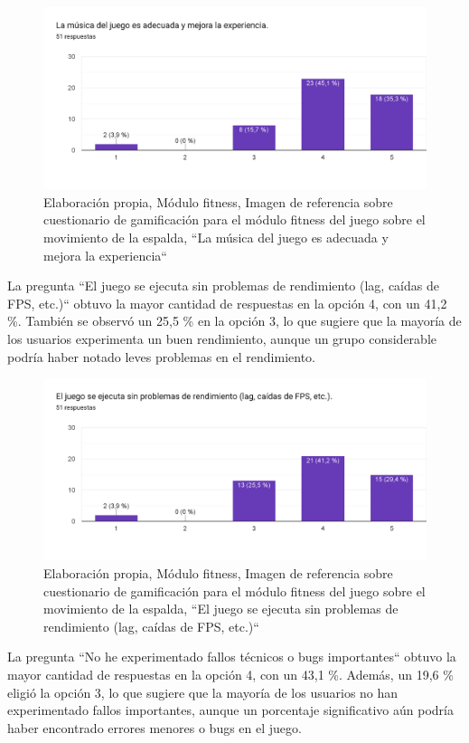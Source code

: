 \begin{figure}[H]
  \centering
  \includegraphics[width=0.7\linewidth]{Imagenes/fd7.png}
  \caption{Elaboración propia, Módulo fitness, Imagen de referencia sobre cuestionario de gamificación para el módulo fitness del juego sobre el movimiento de la espalda, ``La música del juego es adecuada y mejora la experiencia``}
  \label{fig:cuestionario18fitness}
\end{figure}


La pregunta ``El juego se ejecuta sin problemas de rendimiento (lag, caídas de FPS, etc.)`` obtuvo la mayor cantidad de respuestas en la opción 4, con un 41,2 \%. También se observó un 25,5 \% en la opción 3, lo que sugiere que la mayoría de los usuarios experimenta un buen rendimiento, aunque un grupo considerable podría haber notado leves problemas en el rendimiento.

\begin{figure}[H]
  \centering
  \includegraphics[width=0.7\linewidth]{Imagenes/fd8.png}
  \caption{Elaboración propia, Módulo fitness, Imagen de referencia sobre cuestionario de gamificación para el módulo fitness del juego sobre el movimiento de la espalda, ``El juego se ejecuta sin problemas de rendimiento (lag, caídas de FPS, etc.)``}
  \label{fig:cuestionario19fitness}
\end{figure}

La pregunta ``No he experimentado fallos técnicos o bugs importantes`` obtuvo la mayor cantidad de respuestas en la opción 4, con un 43,1 \%. Además, un 19,6 \% eligió la opción 3, lo que sugiere que la mayoría de los usuarios no han experimentado fallos importantes, aunque un porcentaje significativo aún podría haber encontrado errores menores o bugs en el juego.

